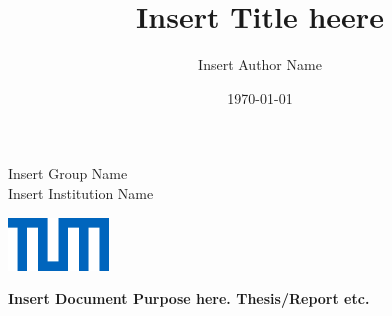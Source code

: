 \title{Insert Title heere}
\author{Insert Author Name}
\date{\today}


\begin{titlepage}
    \begin{minipage}[b]{0.4\linewidth}
        {\color{blue} \scriptsize Insert Group Name \\Insert Institution Name}
    \end{minipage}
    \hfill
    \begin{minipage}[b]{0.3\linewidth}
        {
            \hfill    
            \includegraphics[width=0.2\textwidth]{assets/TUM.png}
            
        }
    \end{minipage}
    
    \begin{center}
        \vspace{25mm}
        \begin{Large}
            \textbf{Insert Document Purpose here. Thesis/Report etc.\\}
        \end{Large}
        \begin{Huge}
            \vspace{10mm}
            \textbf{\thetitle\\}
        \end{Huge}
        \vspace{10mm}
        \begin{large}
            \theauthor\\
            \vspace{5mm}
            \thedate\\
        \end{large}
        

\end{center}
\end{titlepage}
